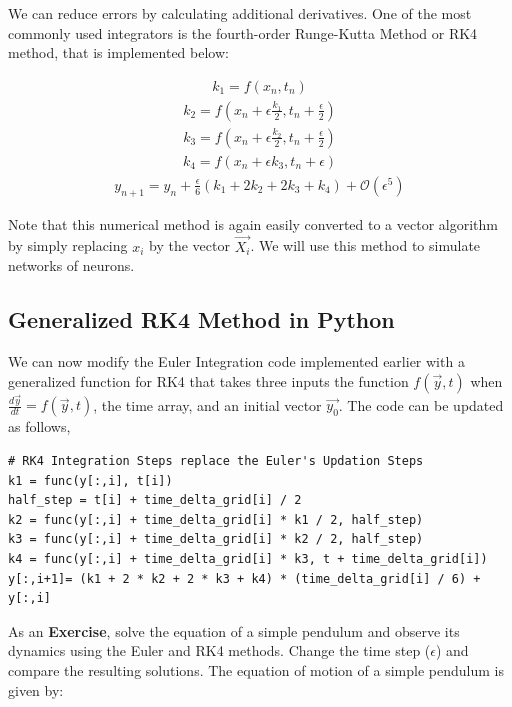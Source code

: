 \documentclass[10pt,letterpaper]{article}
\begin{document}
We can reduce errors by calculating additional derivatives. One of the most commonly used integrators is the fourth-order Runge-Kutta Method or RK4 method, that is implemented below:

\begin{eqnarray}k_1=f(x_n,t_n)\end{eqnarray}
\begin{eqnarray}k_2=f(x_n+\epsilon\frac{k_1}{2},t_n+\frac{\epsilon}{2})\end{eqnarray}
\begin{eqnarray}k_3=f(x_n+\epsilon\frac{k_2}{2},t_n+\frac{\epsilon}{2})\end{eqnarray}
\begin{eqnarray}k_4=f(x_n+\epsilon k_3,t_n+\epsilon)\end{eqnarray}
\begin{eqnarray}y_{n+1}=y_n+\frac{\epsilon}{6}(k_1+2 k_2+2 k_3+k_4)+\mathcal{O}(\epsilon^5)\end{eqnarray}

Note that this numerical method is again easily converted to a vector algorithm by simply replacing $x_i$ by the vector $\vec{X_i}$. We will use this method to simulate networks of neurons.

\subsection*{Generalized RK4 Method in Python}

We can now modify the Euler Integration code implemented earlier with a generalized function for RK4 that takes three inputs \textemdash the function $f(\vec{y},t)$ when $\frac{d\vec{y}}{dt}=f(\vec{y},t)$, the time array, and an initial vector $\vec{y_0}$. The code can be updated as follows,

\begin{verbatim}
# RK4 Integration Steps replace the Euler's Updation Steps
k1 = func(y[:,i], t[i])                               
half_step = t[i] + time_delta_grid[i] / 2
k2 = func(y[:,i] + time_delta_grid[i] * k1 / 2, half_step)
k3 = func(y[:,i] + time_delta_grid[i] * k2 / 2, half_step)
k4 = func(y[:,i] + time_delta_grid[i] * k3, t + time_delta_grid[i])
y[:,i+1]= (k1 + 2 * k2 + 2 * k3 + k4) * (time_delta_grid[i] / 6) + y[:,i]
\end{verbatim}

As an \textbf{Exercise}, solve the equation of a simple pendulum and observe its dynamics using the Euler and RK4 methods. Change the time step ($\epsilon$) and compare the resulting solutions. The equation of motion of a simple pendulum is given by: 
\end{document}
